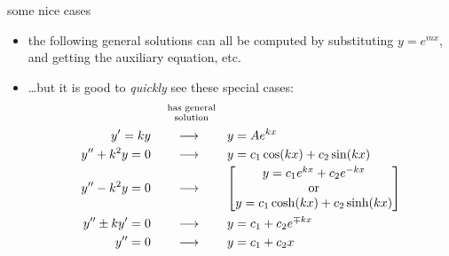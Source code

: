 \documentclass{beamer}
\begin{document}
\begin{frame}{some nice cases}

\begin{itemize}
\item the following general solutions can all be computed by substituting $y=e^{mx}$, and getting the auxiliary equation, etc.
\item \dots but it is good to \emph{quickly} see these special cases:
\newcommand{\genarrow}{\qquad \longrightarrow \qquad}
\begin{align*}
 &\quad\,\, {\scriptsize \begin{matrix} \text{has general} \\ \text{solution} \end{matrix} } \\
y' = k y &\genarrow y=Ae^{kx} \\
y'' + k^2 y = 0 &\genarrow y=c_1\cos(kx) + c_2\sin(kx) \\
y'' - k^2 y = 0 &\genarrow \left[\begin{matrix} y=c_1e^{kx}+c_2e^{-kx} \\
                                      \text{or} \\
                                      y=c_1\cosh(k x) + c_2\sinh(k x)\end{matrix}\right] \\
y'' \pm ky' = 0 &\genarrow y=c_1 + c_2e^{\mp kx} \\
y'' = 0 &\genarrow y=c_1 + c_2 x
\end{align*}
\end{itemize}
\end{frame}
\end{document}
